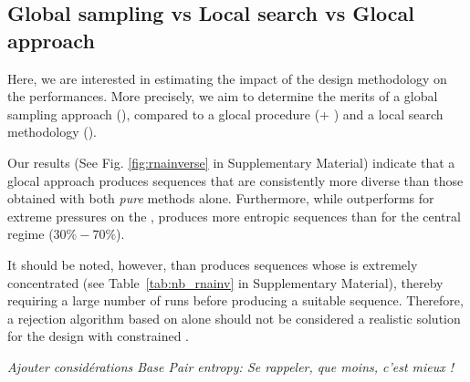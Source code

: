 \subsection{Global sampling vs Local search vs Glocal approach}


Here, we are interested in estimating the impact of the design methodology on the performances. More precisely, we aim to determine the merits of a global sampling approach (\ourprog), compared to a glocal procedure (\ourprog + \RNAinverse) and a local search methodology (\RNAinverse). 

Our results (See Fig. \ref{fig:rnainverse} in Supplementary Material) indicate that a glocal approach produces sequences that are consistently more diverse than those obtained with both {\em pure} methods alone. Furthermore, while \ourprog outperforms \RNAinverse for extreme pressures on the \GCContent, \RNAinverse produces more entropic sequences than \ourprog for the central \GCContent regime ($30\%-70\%$). 

It should be noted, however, than \RNAinverse produces sequences whose \GCContent is extremely concentrated (see Table~\ref{tab:nb_rnainv} in Supplementary Material), thereby requiring a large number of runs before producing a suitable \GCContent sequence. Therefore, a rejection algorithm based on \RNAinverse alone should not be considered a realistic solution for the design with constrained \GCContent. 

{\em Ajouter considérations Base Pair entropy: Se rappeler, que moins, c'est mieux !}











